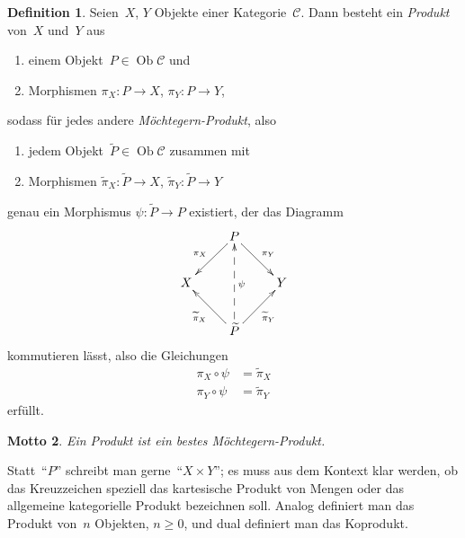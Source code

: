 \documentclass[a4paper,ngerman]{scrartcl}
\theoremstyle{definition}
\newtheorem{defn}{Definition}[section]
\theoremstyle{plain}
\newtheorem{motto}[defn]{Motto}
\theoremstyle{remark}
\newcommand{\C}{\mathcal{C}}
\DeclareMathOperator{\Ob}{Ob}
\begin{document}
\begin{defn}Seien~$X$, $Y$ Objekte einer Kategorie~$\C$. Dann besteht ein
\emph{Produkt} von~$X$ und~$Y$ aus
\begin{enumerate}
\item einem Objekt~$P \in \Ob \C$ und
\item Morphismen $\pi_X : P \to X$, $\pi_Y : P \to Y$,
\end{enumerate}
sodass für jedes andere \emph{Möchtegern-Produkt}, also
\begin{enumerate}
\item jedem Objekt~$\widetilde P \in \Ob \C$ zusammen mit
\item Morphismen $\widetilde \pi_X : \widetilde P \to X$, $\widetilde\pi_Y :
\widetilde P \to Y$
\end{enumerate}
genau ein Morphismus $\psi : \widetilde P \to P$ existiert, der das Diagramm
\[ \xymatrix{
    & P \ar[ld]_{\pi_X} \ar[rd]^{\pi_Y} \\
  X & & Y \\
    & \widetilde P \ar[lu]^{\widetilde \pi_X} \ar@{-->}[uu]_\psi \ar[ru]_{\widetilde \pi_Y}
  } \]
kommutieren lässt, also die Gleichungen
\begin{align*}
  \pi_X \circ \psi &= \widetilde \pi_X \\
  \pi_Y \circ \psi &= \widetilde \pi_Y
\end{align*}
erfüllt.
\end{defn}

\begin{motto}Ein Produkt ist ein bestes Möchtegern-Produkt.\end{motto}

Statt~"`$P$"' schreibt man gerne~"`$X \times Y$"'; es muss aus dem Kontext klar
werden, ob das Kreuzzeichen speziell das kartesische Produkt von Mengen
oder das allgemeine kategorielle Produkt bezeichnen soll.
Analog definiert man das Produkt von~$n$ Objekten, $n \geq 0$, und dual
definiert man das Koprodukt.
\end{document}
